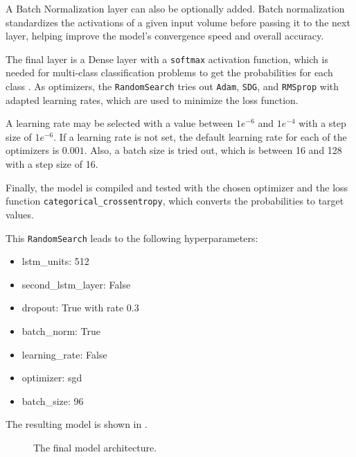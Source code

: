 A Batch Normalization layer can also be optionally added.
Batch normalization standardizes the activations of a given input volume before passing it to the next layer, helping improve the model's convergence speed and overall accuracy.

The final layer is a Dense layer with a \texttt{softmax} activation function, which is needed for multi-class classification problems to get the probabilities for each class \cite{cat_cross_entropy}.
As optimizers, the \texttt{RandomSearch} tries out \texttt{Adam}, \texttt{SDG}, and \texttt{RMSprop} with adapted learning rates, which are used to minimize the loss function.

A learning rate may be selected with a value between \(1e^{-6}\) and \(1e^{-4}\) with a step size of \(1e^{-6}\).
If a learning rate is not set, the default learning rate for each of the optimizers is \(0.001\).
Also, a batch size is tried out, which is between 16 and 128 with a step size of 16.

Finally, the model is compiled and tested with the chosen optimizer and the loss function \texttt{categorical\_crossentropy}, which converts the probabilities to target values.

This \texttt{RandomSearch} leads to the following hyperparameters:
\begin{itemize}
    \item lstm\_units: 512
    \item second\_lstm\_layer: False
    \item dropout: True with rate 0.3
    \item batch\_norm: True
    \item learning\_rate: False
    \item optimizer: sgd
    \item batch\_size: 96
\end{itemize}

The resulting model is shown in .
\begin{figure}[h!]
    \centering
    
    \caption{The final model architecture.}
    \label{final_model}
\end{figure}

